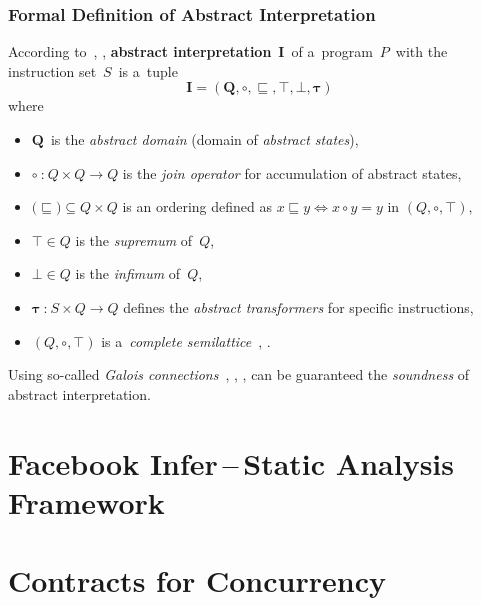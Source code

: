 \subsubsection*{Formal Definition of Abstract Interpretation}

According to~\cite{AILatticeModelCousot}, \cite{favAI},
\textbf{abstract interpretation}~$ \boldsymbol{I} $~of a~program~$ P $~with
the instruction set~$ S $~is a~tuple
$$
    \boldsymbol{I = (Q, \circ, \sqsubseteq, \top, \bot, \tau)}
$$
where
\begin{itemize}
    \item
        $ \boldsymbol{Q} $~is the \emph{abstract domain} (domain of
        \emph{abstract states}),

    \item
        $ \boldsymbol{\circ}~\text{:}~Q \times Q \rightarrow Q $ is the \emph{join
        operator} for accumulation of abstract states,

    \item
        $ \text{(}\boldsymbol{\sqsubseteq}\text{)} \subseteq Q \times Q $ is an
        ordering defined as $ x \sqsubseteq y \Leftrightarrow x \circ y = y $ in
        $ (Q, \circ, \top) $,

    \item
        $ \boldsymbol{\top} \in Q $ is the \emph{supremum} of~$ Q $,

    \item
        $ \boldsymbol{\bot} \in Q $ is the \emph{infimum} of~$ Q $,

    \item
        $ \boldsymbol{\tau}~\text{:}~S \times Q \rightarrow Q $
        defines the \emph{abstract transformers} for specific instructions,

    \item
        $ (Q, \circ, \top) $ is a~\emph{complete
        semilattice}~\cite{favLatticesAndFixpoints}, \cite{favAI}.
\end{itemize}
Using so-called \emph{Galois connections}~\cite{programAnalysisNielson},
\cite{wideningNarrowingCousot}, \cite{favAI}, \cite{AICousotWeb} can be
guaranteed the \emph{soundness} of abstract interpretation.


\section{\texorpdfstring{Facebook Infer\,--\,Static Analysis Framework}{}}
\label{sec:fbinfer}


\section{Contracts for Concurrency}
\label{sec:contracts}



